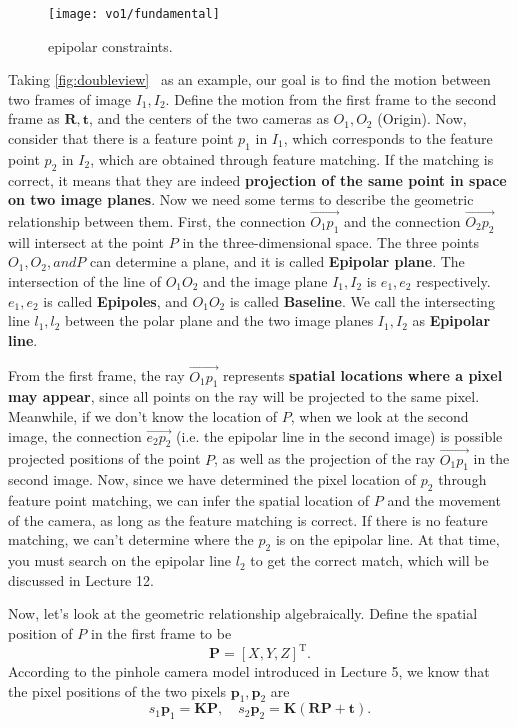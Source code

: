 \begin{figure}[!htp]
	\centering
	\texttt{[image: vo1/fundamental]}
	\caption{epipolar constraints.}
	\label{fig:doubleview}
\end{figure}

Taking \autoref{fig:doubleview}~ as an example, our goal is to find the motion between two frames of image $I_{1}, I_{2}$. Define the motion from the first frame to the second frame as $\bm{R}, \bm{t}$, and the centers of the two cameras as $O_{1}, O_{2}$ (Origin). Now, consider that there is a feature point $p_{1}$ in $I_{1}$, which corresponds to the feature point $p_{2}$ in $I_{2}$, which are obtained through feature matching. If the matching is correct, it means that they are indeed \textbf{projection of the same point in space on two image planes}. Now we need some terms to describe the geometric relationship between them. First, the connection $\overrightarrow{O_{1}p_{1}}$ and the connection $\overrightarrow{O_{2}p_{2}}$ will intersect at the point $P$ in the three-dimensional space. The three points $O_{1}, O_{2}, and P$ can determine a plane, and it is called \textbf{Epipolar plane}. The intersection of the line of $O_{1}O_{2}$ and the image plane $I_{1}, I_{2}$ is $e_{1}, e_{2}$ respectively. $e_{1}, e_{2}$ is called \textbf{Epipoles}, and $O_{1}O_{2}$ is called \textbf{Baseline}. We call the intersecting line $l_{1},l_{2}$ between the polar plane and the two image planes $I_{1}, I_{2}$ as \textbf{Epipolar line}.

From the first frame, the ray $\overrightarrow{O_1 p_1}$ represents \textbf{spatial locations where a pixel may appear}, since all points on the ray will be projected to the same pixel. Meanwhile, if we don’t know the location of $P$, when we look at the second image, the connection $\overrightarrow{e_2 p_2}$ (i.e. the epipolar line in the second image) is possible projected positions of the point $P$, as well as the projection of the ray $\overrightarrow{O_1 p_1}$ in the second image. Now, since we have determined the pixel location of $p_2$ through feature point matching, we can infer the spatial location of $P$ and the movement of the camera, as long as the feature matching is correct. If there is no feature matching, we can't determine where the $p_2$ is on the epipolar line. At that time, you must search on the epipolar line $l_2$ to get the correct match, which will be discussed in Lecture 12.

Now, let's look at the geometric relationship algebraically. Define the spatial position of $P$ in the first frame to be
\[
\bm{P}=[X,Y,Z]^\mathrm{T}.
\]
According to the pinhole camera model introduced in Lecture 5, we know that the pixel positions of the two pixels $\bm{p}_1,\bm{p}_2$ are
\begin{equation}
s_1 {\bm{p}_1} = \bm{KP},\quad s_2 \bm{p}_2 = \bm{K}\left( \bm{RP + t} \right).
\end{equation}

